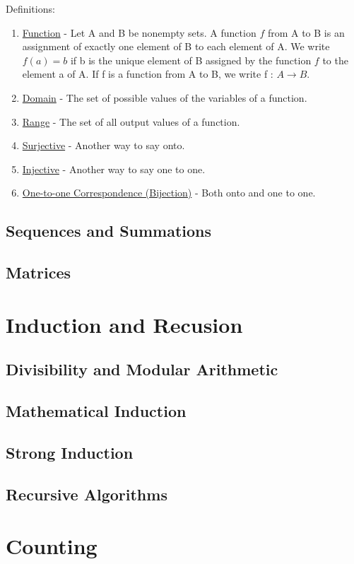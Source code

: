 \documentclass[12pt]{article}
\begin{document}
Definitions:
\begin{enumerate}

\item \underline{Function} - Let A and B be nonempty sets. A function $f$ from A to B is an assignment of exactly one element of B to each element of A. We write $f(a) = b$ if b is the unique element of B assigned by the function $f$ to the element a of A. If f is a function from A to B, we write f : $A \rightarrow B$.
\item \underline{Domain} - The set of possible values of the variables of a function.
\item \underline{Range} - The set of all output values of a function.
\item \underline{Surjective} - Another way to say onto.
\item \underline{Injective} - Another way to say one to one.
\item \underline{One-to-one Correspondence (Bijection)} - Both onto and one to one.
\end{enumerate}

\subsection{Sequences and Summations}
\subsection{Matrices}

\section{Induction and Recusion}
\subsection{Divisibility and Modular Arithmetic}
\subsection{Mathematical Induction}
\subsection{Strong Induction}
\subsection{Recursive Algorithms}

\section{Counting}
\end{document}
